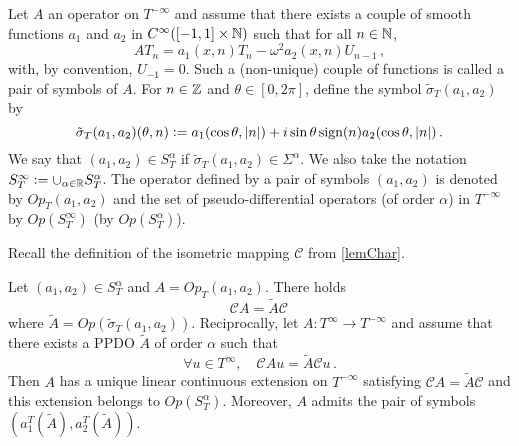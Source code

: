 \documentclass[a4paper]{article}
\begin{document}
\begin{Def}
	Let $A$ an operator on $T^{-\infty}$ and assume that there exists a couple of smooth functions $a_1$ and $a_2$ in $C^{\infty}([-1,1]\times \mathbb{N})$ such that for all $n \in \mathbb{N}$,
	\begin{equation}
	AT_n = a_1(x,n) T_n - \omega^2 a_2(x,n) U_{n-1}\,,
	\label{defOpTs}
	\end{equation}
	with, by convention, $U_{-1} = 0$. Such a (non-unique) couple of functions is called a pair of symbols of $A$. For $n\in \mathbb{Z}$ and $\theta \in [0,2\pi]$, define the symbol $\tilde{\sigma}_T(a_1,a_2)$ by
	\[\tilde{\sigma}_T(a_1,a_2)(\theta,n) \mathrel{\mathop:}= a_1(\cos\theta,\left\lvert n \right\rvert) + i \sin\theta\,\text{sign}(n) a_2(\cos\theta,\left\lvert n \right\rvert)\,.\]
	We say that $(a_1,a_2) \in S^\alpha_T$ if $\tilde{\sigma}_T(a_1,a_2) \in \Sigma^\alpha$. We also take the notation $S^{\infty}_T \mathrel{\mathop:}= \cup_{\alpha \in \mathbb{R}} S^\alpha_T$. The operator defined by a pair of symbols $(a_1,a_2)$ is denoted by $\textit{Op}_T(a_1,a_2)$ and the set of pseudo-differential operators (of order $\alpha$) in $T^{-\infty}$ by $\textit{Op}(S^\infty_T)$ (by $\textit{Op}(S^\alpha_T)$).
\end{Def} 
\noindent Recall the definition of the isometric mapping $\mathcal{C}$ from \autoref{lemChar}.
\begin{The}
	\label{PDOTs}
	Let $(a_1,a_2) \in S^\alpha_T$ and $A = \textit{Op}_T(a_1,a_2)$.  There holds
	\[\mathcal{C}A = \tilde{A}\mathcal{C}\,\]
	where $\tilde{A} = \textit{Op}(\tilde{\sigma}_T(a_1,a_2))$. 
	Reciprocally, let $A : T^{\infty} \to T^{-\infty}$ and assume that there exists a PPDO $\tilde{A}$ of order $\alpha$ such that
	\[\forall u \in T^{\infty},\quad \mathcal{C}Au = \tilde{A}\mathcal{C}u\,.\]
	Then $A$ has a unique linear continuous extension on $T^{-\infty}$ satisfying $\mathcal{C}A = \tilde{A} \mathcal{C}$ and this extension belongs to $\textit{Op}(S^\alpha_T)$. Moreover, $A$ admits the pair of symbols $(a_1^T(\tilde{A}),a_2^T(\tilde{A}))$.
\end{The}
\end{document}
